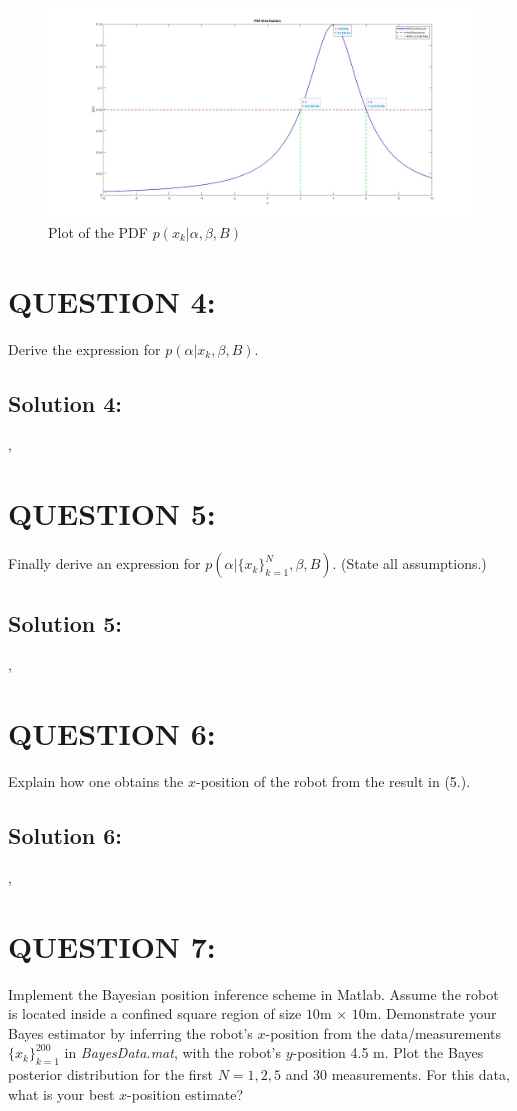 \documentclass[a4paper,11pt]{article}
\begin{document}
\begin{figure}
        \centering
        \includegraphics[scale=0.16]{q03pdfplot.jpg} 
        \caption{Plot of the PDF $p(x_k | \alpha, \beta, B)$}
\end{figure}


\section{QUESTION 4:}
Derive the expression for $p(\alpha | x_k, \beta, B)$.

\subsection{Solution 4:}
,

\section{QUESTION 5:}
Finally derive an expression for $p(\alpha | \{x_k\}^N _{k = 1}, \beta, B)$. (State all assumptions.)

\subsection{Solution 5:}
,

\section{QUESTION 6:}
Explain how one obtains the $x$-position of the robot from the result in (5.).

\subsection{Solution 6:}
,

\section{QUESTION 7:}
Implement the Bayesian position inference scheme in Matlab. Assume the robot is
located inside a confined square region of size $10$m $\times$ $10$m. Demonstrate your Bayes
estimator by inferring the robot’s $x$-position from the data/measurements $\{ x_k \}^{200} _{k = 1}$ in \emph{BayesData.mat}, with the robot’s $y$-position 4.5 m. Plot the Bayes posterior distribution for the first $N = 1, 2, 5$ and $30$ measurements. For this data, what is your best $x$-position estimate?
\end{document}
